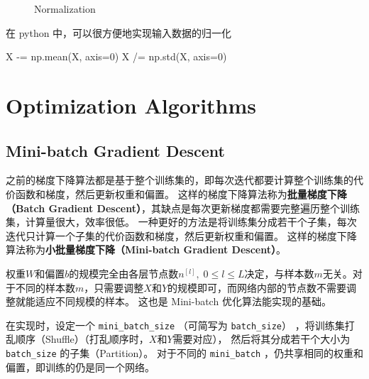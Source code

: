 \begin{figure}[h!bt]
    \centering
    \centering
    \caption{Normalization}
    \label{fig:normalization}
\end{figure}

在 python 中，可以很方便地实现输入数据的归一化
\begin{python}
X -= np.mean(X, axis=0)
X /= np.std(X, axis=0)
\end{python}

\section{Optimization Algorithms}

\subsection{Mini-batch Gradient Descent}

之前的梯度下降算法都是基于整个训练集的，即每次迭代都要计算整个训练集的代价函数和梯度，然后更新权重和偏置。
这样的梯度下降算法称为\textbf{批量梯度下降（Batch Gradient Descent）}，其缺点是每次更新梯度都需要完整遍历整个训练集，计算量很大，效率很低。
一种更好的方法是将训练集分成若干个子集，每次迭代只计算一个子集的代价函数和梯度，然后更新权重和偏置。
这样的梯度下降算法称为\textbf{小批量梯度下降（Mini-batch Gradient Descent）}。

\begin{hint}
    权重$W$和偏置$b$的规模完全由各层节点数$n^{[l]},\; 0 \leqslant l \leqslant L$决定，与样本数$m$无关。对于不同的样本数$m$，只需要调整$X$和$Y$的规模即可，而网络内部的节点数不需要调整就能适应不同规模的样本。
    这也是 Mini-batch 优化算法能实现的基础。
\end{hint}

在实现时，设定一个 \verb|mini_batch_size| （可简写为 \verb|batch_size|） ，将训练集打乱顺序（Shuffle）（打乱顺序时，$X$和$Y$需要对应），
然后将其分成若干个大小为 \verb|batch_size| 的子集（Partition）。
对于不同的 \verb|mini_batch| ，仍共享相同的权重和偏置，即训练的仍是同一个网络。

